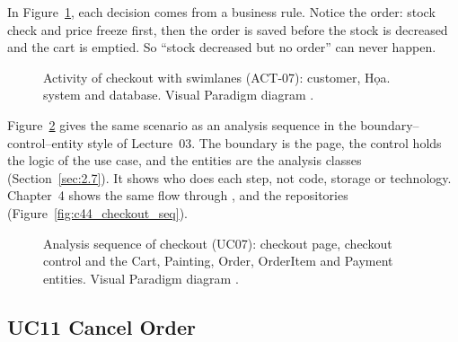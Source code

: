 In Figure~\ref{fig:actcheckout}, each decision comes from a business rule. Notice the order: stock check and price
freeze first, then the order is saved before the stock is decreased and the cart is emptied. So ``stock decreased but no order'' can never
happen.

\begin{figure}[H]
\centering
{}
\caption[Activity of checkout with swimlanes (ACT-07)]{Activity of checkout with swimlanes (ACT-07): customer, Họa. system and database. Visual Paradigm diagram .}\label{fig:c2_activity_checkout}\label{fig:actcheckout}
\end{figure}

Figure~\ref{fig:c2_bce_checkout} gives the same scenario as an analysis sequence in the boundary--control--entity
style of Lecture~03. The boundary is the page, the control holds the logic of the use case, and the entities are
the analysis classes (Section~\ref{sec:2.7}). It shows who does each step, not code, storage or technology. Chapter~4 shows the same flow through ,
 and the repositories (Figure~\ref{fig:c44_checkout_seq}).

\begin{figure}[H]
\centering
{}
\caption[Analysis sequence of checkout (boundary, control, entity)]{Analysis sequence of checkout (UC07): checkout page, checkout control and the Cart, Painting, Order, OrderItem and Payment entities. Visual Paradigm diagram .}\label{fig:c2_bce_checkout}
\end{figure}

\subsection{UC11 Cancel Order}\label{sec:2.2.4}

